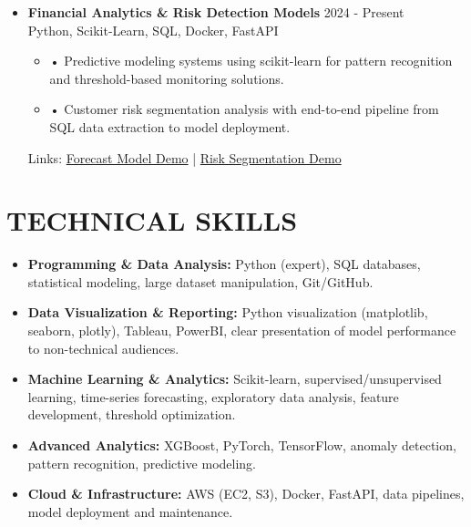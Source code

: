 \documentclass[a4paper,9pt]{extarticle}
\begin{document}
\begin{itemize}[leftmargin=0.4cm, label={}]
    \item \textbf{Financial Analytics \& Risk Detection Models} \hfill 2024 - Present \\
    Python, Scikit-Learn, SQL, Docker, FastAPI
    \begin{itemize}[leftmargin=0.3cm, label={}]
    \item \small{•} \normalsize{Predictive modeling systems using scikit-learn for pattern recognition and threshold-based monitoring solutions.} 
    \item \small{•} \normalsize{Customer risk segmentation analysis with end-to-end pipeline from SQL data extraction to model deployment.}
    \end{itemize}
    Links: \href{https://twallett.com/sales-forecast}{Forecast Model Demo} | \href{https://twallett.com/customer-segmentation}{Risk Segmentation Demo} 
\end{itemize}

\section*{TECHNICAL SKILLS}

\begin{itemize}[leftmargin=0.5cm, label={}]
    \item \textbf{Programming \& Data Analysis:} Python (expert), SQL databases, statistical modeling, large dataset manipulation, Git/GitHub. \\
    
    \item \textbf{Data Visualization \& Reporting:} Python visualization (matplotlib, seaborn, plotly), Tableau, PowerBI, clear presentation of model performance to non-technical audiences. \\
    
    \item \textbf{Machine Learning \& Analytics:} Scikit-learn, supervised/unsupervised learning, time-series forecasting, exploratory data analysis, feature development, threshold optimization. \\
    
    \item \textbf{Advanced Analytics:} XGBoost, PyTorch, TensorFlow, anomaly detection, pattern recognition, predictive modeling. \\
    
    \item \textbf{Cloud \& Infrastructure:} AWS (EC2, S3), Docker, FastAPI, data pipelines, model deployment and maintenance.
\end{itemize}

\end{document}
